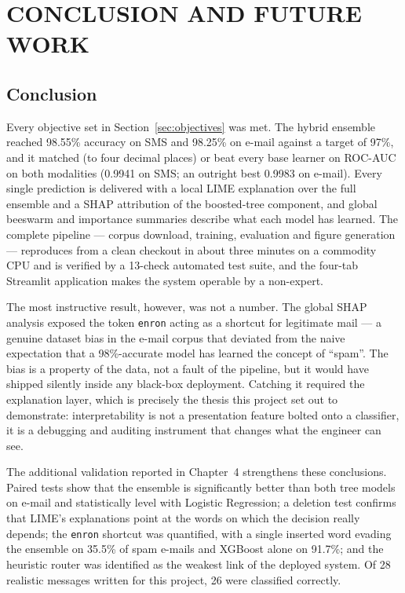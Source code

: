\documentclass[12pt,a4paper]{report}
\begin{document}
\chapter{CONCLUSION AND FUTURE WORK}

\section{Conclusion}

Every objective set in Section~\ref{sec:objectives} was met. The hybrid ensemble reached
98.55\% accuracy on SMS and 98.25\% on e-mail against a target of 97\%, and
it matched (to four decimal places) or beat every base learner on ROC-AUC on
both modalities (0.9941
on SMS; an outright best 0.9983 on e-mail). Every single prediction is
delivered with a local LIME explanation over the full ensemble and a SHAP
attribution of the boosted-tree component, and global beeswarm and importance
summaries describe what each model has learned. The complete pipeline ---
corpus download, training, evaluation and figure generation --- reproduces
from a clean checkout in about three minutes on a commodity CPU and is
verified by a 13-check automated test suite, and the four-tab Streamlit
application makes the system operable by a non-expert.

The most instructive result, however, was not a number. The global SHAP
analysis exposed the token \texttt{enron} acting as a shortcut for legitimate
mail --- a genuine dataset bias in the e-mail corpus that deviated from the
naive expectation that a 98\%-accurate model has learned the concept of
``spam''. The bias is a property of the data, not a fault of the pipeline,
but it would have shipped silently inside any black-box deployment. Catching
it required the explanation layer, which is precisely the thesis this
project set out to demonstrate: interpretability is not a presentation
feature bolted onto a classifier, it is a debugging and auditing instrument
that changes what the engineer can see.

The additional validation reported in Chapter~4 strengthens these
conclusions. Paired tests show that the ensemble is significantly better than
both tree models on e-mail and statistically level with Logistic Regression; a
deletion test confirms that LIME's explanations point at the words on which
the decision really depends; the \texttt{enron} shortcut was quantified, with a
single inserted word evading the ensemble on 35.5\% of spam e-mails and
XGBoost alone on 91.7\%; and the heuristic router was identified as the
weakest link of the deployed system. Of 28 realistic messages written for this
project, 26 were classified correctly.
\end{document}
